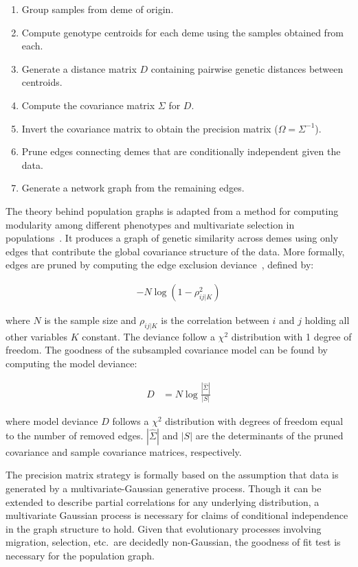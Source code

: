 \documentclass{essay}
\begin{document}
\begin{enumerate}
  \item Group samples from deme of origin.
  \item Compute genotype centroids for each deme using the samples obtained
    from each.
  \item Generate a distance matrix $D$ containing pairwise genetic distances
    between centroids.
  \item Compute the covariance matrix $\Sigma$ for $D$.
  \item Invert the covariance matrix to obtain the precision matrix ($\Omega =
    \Sigma^{-1}$).
  \item Prune edges connecting demes that are conditionally independent given
    the data.
  \item Generate a network graph from the remaining edges.
\end{enumerate}

The theory behind population graphs is adapted from a method for computing
modularity among different phenotypes and multivariate selection in
populations~\cite{magwene_new_2001}. It produces a graph of genetic similarity
across demes using only edges that contribute the global covariance structure
of the data. More formally, edges are pruned by computing the edge exclusion
deviance~\cite{whittaker_graphical_2009}, defined by:

\begin{align}
  -N\log(1 - \rho^2_{ij|K})
\end{align}

where $N$ is the sample size and $\rho_{ij|K}$ is the correlation between $i$
and $j$ holding all other variables $K$ constant. The deviance follow a
$\chi^2$ distribution with 1 degree of freedom. The goodness of the subsampled
covariance model can be found by computing the model deviance:

\begin{align}
  D &= N \log\frac{| \hat\Sigma |}{| S |}
\end{align}

where model deviance $D$ follows a $\chi^2$ distribution with degrees of
freedom equal to the number of removed edges. $|\hat\Sigma|$ and $|S|$ are the
determinants of the pruned covariance and sample covariance matrices,
respectively.

The precision matrix strategy is formally based on the assumption that data is
generated by a multivariate-Gaussian generative process. Though it can be
extended to describe partial correlations for any underlying distribution, a
multivariate Gaussian process is necessary for claims of conditional
independence in the graph structure to hold. Given that evolutionary processes
involving migration, selection, etc.\ are decidedly non-Gaussian, the goodness of
fit test is necessary for the population graph.
\end{document}
